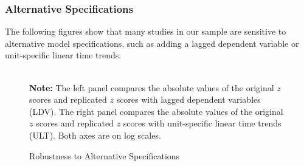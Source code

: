 \documentclass[12pt]{article}
\begin{document}
\clearpage


\subsubsection{Alternative Specifications}

The following figures show that many studies in our sample are sensitive to alternative model specifications, such as adding a lagged dependent variable or unit-specific linear time trends. 

\begin{figure}[!ht]
\caption{Robustness to Alternative Specifications}\label{fg:ldv_ult}
\centering
\begin{minipage}{1\linewidth}{
\centering
\hspace{-1em}
\hspace{1em}
}\\
\footnotesize\textbf{Note:} The left panel compares the absolute values of the original $z$ scores and replicated $z$ scores with lagged dependent variables (LDV). The right panel compares the absolute values of the original $z$ scores and replicated $z$ scores with unit-specific linear time trends (ULT). Both axes are on log scales.
\end{minipage}\vspace{-0.5em}
\end{figure}
\clearpage
\end{document}
